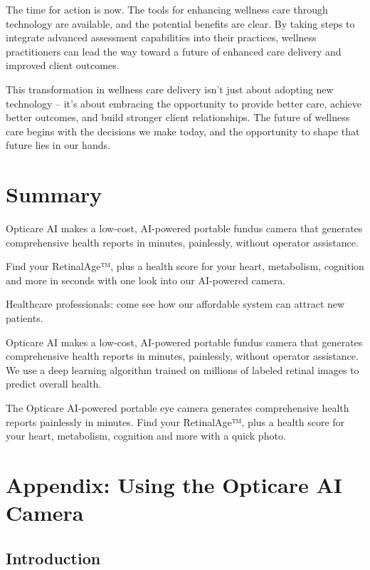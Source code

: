 \documentclass[
  Letterpaper,
]{scrbook}
\begin{document}
The time for action is now. The tools for enhancing wellness care
through technology are available, and the potential benefits are clear.
By taking steps to integrate advanced assessment capabilities into their
practices, wellness practitioners can lead the way toward a future of
enhanced care delivery and improved client outcomes.

This transformation in wellness care delivery isn't just about adopting
new technology -- it's about embracing the opportunity to provide better
care, achieve better outcomes, and build stronger client relationships.
The future of wellness care begins with the decisions we make today, and
the opportunity to shape that future lies in our hands.


\chapter{Summary}\label{summary}

Opticare AI makes a low-cost, AI-powered portable fundus camera that
generates comprehensive health reports in minutes, painlessly, without
operator assistance.

Find your RetinalAge™, plus a health score for your heart, metabolism,
cognition and more in seconds with one look into our AI-powered camera.

Healthcare professionals: come see how our affordable system can attract
new patients.

Opticare AI makes a low-cost, AI-powered portable fundus camera that
generates comprehensive health reports in minutes, painlessly, without
operator assistance. We use a deep learning algorithm trained on
millions of labeled retinal images to predict overall health.

The Opticare AI-powered portable eye camera generates comprehensive
health reports painlessly in minutes. Find your RetinalAge™, plus a
health score for your heart, metabolism, cognition and more with a quick
photo.


\chapter{Appendix: Using the Opticare AI
Camera}\label{appendix-using-the-opticare-ai-camera}

\section{Introduction}\label{introduction-4}
\end{document}

